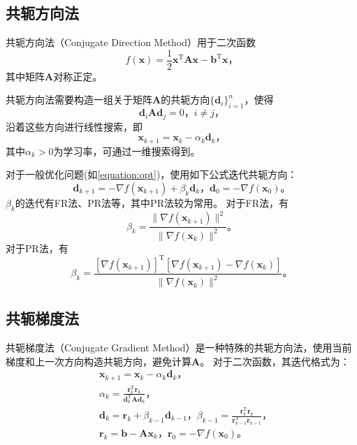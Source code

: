\subsection{共轭方向法}

共轭方向法（Conjugate Direction Method）用于二次函数
\begin{equation*}
    f(\bm{x})=\frac{1}{2}\bm{x}^\mathrm{T}\bm{Ax}-\bm{b}^\mathrm{T}\bm{x} \text{，}
\end{equation*}
其中矩阵$\bm{A}$对称正定。

共轭方向法需要构造一组关于矩阵$\bm{A}$的共轭方向$\{\bm{d}_i\}_{i=1}^n$，使得
\begin{equation*}
    \bm{d}_i\bm{A}\bm{d}_j=0 \text{，} i\ne j \text{，}
\end{equation*}
沿着这些方向进行线性搜索，即
\begin{equation*}
    \bm{x}_{k+1}=\bm{x}_k-\alpha_k\bm{d}_k \text{，}
\end{equation*}
其中$\alpha_k>0$为学习率，可通过一维搜索得到。

对于一般优化问题(如\cref{equation:opt})，使用如下公式迭代共轭方向：
\begin{equation*}
    \bm{d}_{k+1}=-\nabla f(\bm{x}_{k+1})+\beta_k\bm{d}_k \text{，} \bm{d}_0=-\nabla f(\bm{x}_0) \text{。}
\end{equation*}
$\beta_k$的迭代有FR法、PR法等，其中PR法较为常用。
对于FR法，有
\begin{equation*}
    \beta_k=\frac{\|\nabla f(\bm{x}_{k+1})\|^2}{\|\nabla f(\bm{x}_{k})\|^2} \text{。}
\end{equation*}
对于PR法，有
\begin{equation*}
    \beta_k=\frac{\left[\nabla f(\bm{x}_{k+1})\right]^\mathrm{T}[\nabla f(\bm{x}_{k+1})-\nabla f(\bm{x}_{k})]}{\|\nabla f(\bm{x}_{k})\|^2} \text{。}
\end{equation*}

\subsection{共轭梯度法}

共轭梯度法（Conjugate Gradient Method）是一种特殊的共轭方向法，使用当前梯度和上一次方向构造共轭方向，避免计算$\bm{A}$。
对于二次函数，其迭代格式为：
\begin{align*}
    &\bm{x}_{k+1}=\bm{x}_k-\alpha_k\bm{d}_k \text{，} \\
    &\alpha_k=\frac{\bm{r}_k^\mathrm{T}\bm{r}_k}{\bm{d}_k^\mathrm{T}\bm{Ad}_k} \text{，} \\
    &\bm{d}_k=\bm{r}_k+\beta_{k-1}\bm{d}_{k-1} \text{，} \beta_{k-1}=\frac{\bm{r}_k^\mathrm{T}\bm{r}_k}{\bm{r}_{k-1}^\mathrm{T}\bm{r}_{k-1}} \text{，} \\
    &\bm{r}_k=\bm{b}-\bm{Ax}_k \text{，} \bm{r}_0=-\nabla f(\bm{x}_0) \text{。}
\end{align*}

